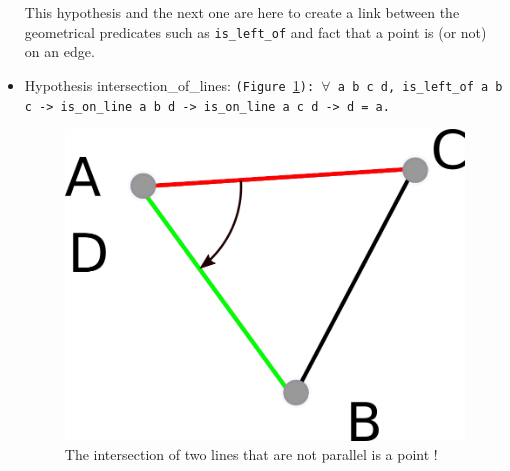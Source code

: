 \documentclass[a4paper,10pt]{article}
\def\hypothesis#1#2{{\color{purple}Hypothesis} {\color{blue}#1}: {\tt #2}}
\begin{document}
\begin{itemize}
         This hypothesis and the next one are here to create a link between the geometrical predicates such as {\tt is\_left\_of} and fact that a point is (or not) on an edge.
       \item \hypothesis{intersection\_of\_lines}{(Figure \ref{intersection_line}):
            $\forall$ a b c d,
is\_left\_of a b c -> is\_on\_line a b d ->
is\_on\_line a c d -> d = a.}
\\\begin{figure}
\centering
\includegraphics[scale=2]{il}
\caption{\label{intersection_line} The intersection of two lines that are not parallel is a point !}
\end{figure}
\end{itemize}
\end{document}
